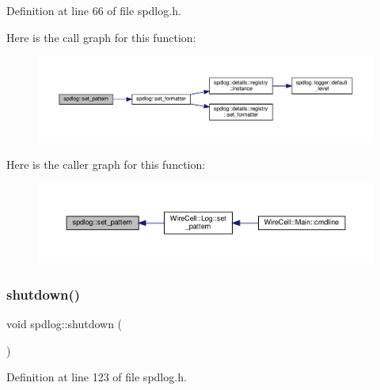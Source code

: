 Definition at line 66 of file spdlog.\+h.

Here is the call graph for this function\+:
\nopagebreak
\begin{figure}[H]
\begin{center}
\leavevmode
\includegraphics[width=350pt]{namespacespdlog_a638029f343e8dd2393d62288b1eb095e_cgraph}
\end{center}
\end{figure}
Here is the caller graph for this function\+:
\nopagebreak
\begin{figure}[H]
\begin{center}
\leavevmode
\includegraphics[width=350pt]{namespacespdlog_a638029f343e8dd2393d62288b1eb095e_icgraph}
\end{center}
\end{figure}
\mbox{\label{namespacespdlog_a38b5c05a859763c5e350e8ec3da9e328}} 
\subsubsection{\texorpdfstring{shutdown()}{shutdown()}}
{\footnotesize\ttfamily void spdlog\+::shutdown (\begin{DoxyParamCaption}{ }\end{DoxyParamCaption})\hspace{0.3cm}{\ttfamily [inline]}}



Definition at line 123 of file spdlog.\+h.

